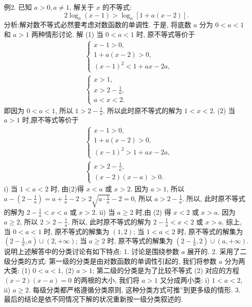 例2. 已知 $a>0, a \neq 1$, 解关于 $x$ 的不等式:
$$
2 \log _a(x-1)>\log _a[1+a(x-2)] .
$$
分析:解对数不等式必然要考虑对数函数的单调性.
于是, 将底数 $a$ 分为 $0<a<1$ 和 $a>1$ 两种情形讨论.
解 (1) 当 $0<a<1$ 时, 原不等式等价于
$$
\begin{aligned}
& \left\{\begin{array}{l}
x-1>0, \\
1+a(x-2)>0, \\
(x-1)^2<1+a x-2 a,
\end{array}\right. \\
& \left\{\begin{array}{l}
x>1, \\
x>2-\frac{1}{a}, \\
a<x<2 .
\end{array}\right.
\end{aligned}
$$
即因为 $0<a<1$, 所以 $1>2-\frac{1}{a}$. 所以此时原不等式的解为 $1<x<2$.
(2) 当 $a>1$ 时,原不等式等价于
$$
\begin{aligned}
& \left\{\begin{array}{l}
x-1>0, \\
1+a(x-2)>0, \\
(x-1)^2>1+a x-2 a,
\end{array}\right. \\
& \left\{\begin{array}{l}
x>2-\frac{1}{a}, \\
(x-2)(x-a)>0 .
\end{array}\right.
\end{aligned}
$$
i) 当 $1<a<2$ 时, 由(2)得 $x<a$ 或 $x>2$.
因为 $a>1$, 所以 $a-\left(2-\frac{1}{a}\right)=a+\frac{1}{a}-2>2 \sqrt{a \cdot \frac{1}{a}}-2=0$, 所以 $a>2-\frac{1}{a}$.
所以, 此时原不等式的解为 $2-\frac{1}{a}<x<a$ 或 $x>2$.
ii) 当 $a \geqslant 2$ 时,由 (2) 得 $x<2$ 或 $x>a$.
因为 $a \geqslant 2$, 所以 $2>2-\frac{1}{a}$.
所以, 此时原不等式的解为 $2-\frac{1}{a}<x<2$ 或 $x>a$.
综上, 当 $0<a<1$ 时, 原不等式的解集为 $(1,2)$; 当 $1<a<2$ 时, 原不等式的解集为 $\left(2-\frac{1}{a}, a\right) \cup(2,+\infty)$; 当 $a \geqslant 2$ 时, 原不等式的解集为 $\left(2-\frac{1}{a}, 2\right) \cup(a,+\infty)$.
说明上述解答中的分类讨论有如下特点:
1. 讨论是围绕参数 $a$ 展开的.
2. 采用了二级分类的方式: 第一级的分类是由对数函数的单调性引起的, 我们将参数 $a$ 分为两大类: (1) $0<a<1$, (2) $a>1$; 第二级的分类是为了比较不等式 (2) 对应的方程 $(x-2)(x-a)=0$ 的两根的大小, 我们将 $a>1$ 又分成两小类: i) $1<a<2$, ii) $a \geqslant 2$. 每级分类都严格遵循分类原则, 这种分类方式可推”到更多级的情形.
3. 最后的结论是依不同情况下解的状况重新按一级分类叙述的.



